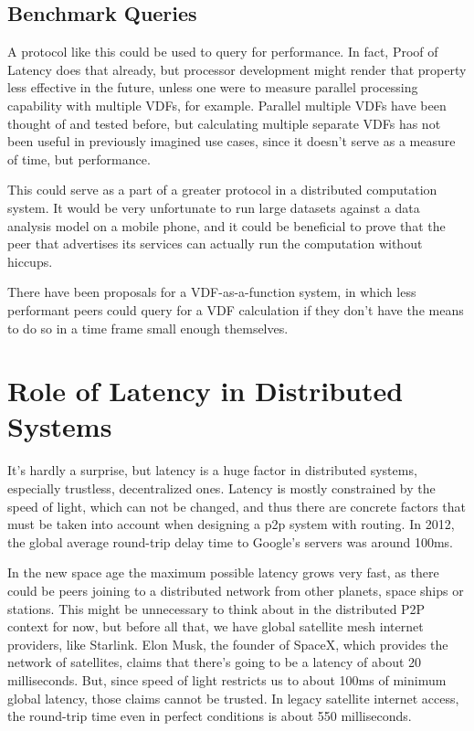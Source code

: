 \subsection{Benchmark Queries}
A protocol like this could be used to query for performance. In fact, Proof of Latency does that already, but processor development might render that property less effective in the future, unless one were to measure parallel processing capability with multiple VDFs, for example. Parallel multiple VDFs have been thought of and tested before, but calculating multiple separate VDFs has not been useful in previously imagined use cases, since it doesn't serve as a measure of time, but performance.

This could serve as a part of a greater protocol in a distributed computation system. It would be very unfortunate to run large datasets against a data analysis model on a mobile phone, and it could be beneficial to prove that the peer that advertises its services can actually run the computation without hiccups.

There have been proposals for a VDF-as-a-function system, in which less performant peers could query for a VDF calculation if they don't have the means to do so in a time frame small enough themselves. 

\section{Role of Latency in Distributed Systems}
It's hardly a surprise, but latency is a huge factor in distributed systems, especially trustless, decentralized ones. Latency is mostly constrained by the speed of light, which can not be changed, and thus there are concrete factors that must be taken into account when designing a p2p system with routing. In 2012, the global average round-trip delay time to Google's servers was around 100ms.\cite{Grigorik_undated-mc}

In the new space age the maximum possible latency grows very fast, as there could be peers joining to a distributed network from other planets, space ships or stations. This might be unnecessary to think about in the distributed P2P context for now, but before all that, we have global satellite mesh internet providers, like Starlink. Elon Musk, the founder of SpaceX, which provides the network of satellites, claims that there's going to be a latency of about 20 milliseconds.\cite{Tung_undated-ny} But, since speed of light restricts us to about 100ms of minimum global latency, those claims cannot be trusted. In legacy satellite internet access, the round-trip time even in perfect conditions is about 550 milliseconds.\cite{noauthor_undated-zc}


